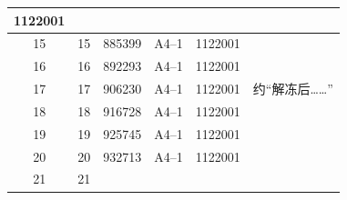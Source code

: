 \documentclass[UTF8,10pt,a4paper,fontset=fandol]{ctexart}
\newcommand{\fieldvalue}[1]{#1}
\newcommand{\handwritten}[1]{#1}
\begin{document}
\begin{center}
\begin{tabularx}{\textwidth}{|c|c|c|c|c|X|}
\fieldvalue{1122001} & \\
\hline
15 &
\fieldvalue{15} &
\fieldvalue{885399} &
\fieldvalue{A4--1} &
\fieldvalue{1122001} & \\
\hline
16 &
\fieldvalue{16} &
\fieldvalue{892293} &
\fieldvalue{A4--1} &
\fieldvalue{1122001} & \\
\hline
17 &
\fieldvalue{17} &
\fieldvalue{906230} &
\fieldvalue{A4--1} &
\fieldvalue{1122001} &
\fieldvalue{\handwritten{约“解冻后……”}} \\
\hline
18 &
\fieldvalue{18} &
\fieldvalue{916728} &
\fieldvalue{A4--1} &
\fieldvalue{1122001} & \\
\hline
19 &
\fieldvalue{19} &
\fieldvalue{925745} &
\fieldvalue{A4--1} &
\fieldvalue{1122001} & \\
\hline
20 &
\fieldvalue{20} &
\fieldvalue{932713} &
\fieldvalue{A4--1} &
\fieldvalue{1122001} & \\
\hline
21 &
\fieldvalue{21} &

\end{tabularx}
\end{center}
\end{document}
